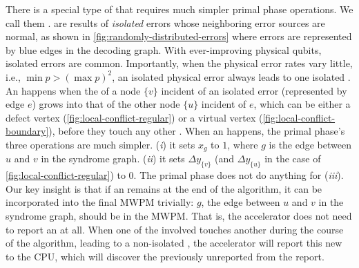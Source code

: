 There is a special type of \conf that requires much simpler primal phase operations.
We call them \isl \confs.
\Isl \confs are results of \emph{isolated} errors whose neighboring error sources are normal, as shown in \autoref{fig:randomly-distributed-errors} where errors are represented by blue edges in the decoding graph.  
With ever-improving physical qubits, isolated errors are common.
Importantly, when the physical error rates vary little, i.e., $\min p > (\max p)^2$, an isolated physical error always leads to one isolated \conf.
An \isl \conf happens when the \cov of a node $\{v\}$ incident of an isolated error (represented by edge $e$) grows into that of the other node $\{u\}$ incident of $e$, which can be either a defect vertex (\autoref{fig:local-conflict-regular}) or a virtual vertex (\autoref{fig:local-conflict-boundary}), before they touch any other \covs.
When an \isl \conf happens, the primal phase's three operations are much simpler.
(\textit{i}) it sets $x_g$ to $1$, where $g$ is the edge between $u$ and $v$ in the syndrome graph. (\textit{ii}) it sets $\Delta y_{\{v\}}$ (and $\Delta y_{\{u\}}$ in the case of \autoref{fig:local-conflict-regular}) to $0$. The primal phase does not do anything for (\textit{iii}).
Our key insight is that if an \isl \conf remains \isl at the end of the algorithm, it can be incorporated into the final MWPM trivially: $g$, the edge between $u$ and $v$ in the syndrome graph, should be in the MWPM.
That is, the accelerator does not need to report an \isl \conf at all. When one of the involved \covs touches another \cov during the course of the algorithm, leading to a non-isolated \conf, the accelerator will report this new \conf to the CPU, which will discover the previously unreported \conf from the report.

